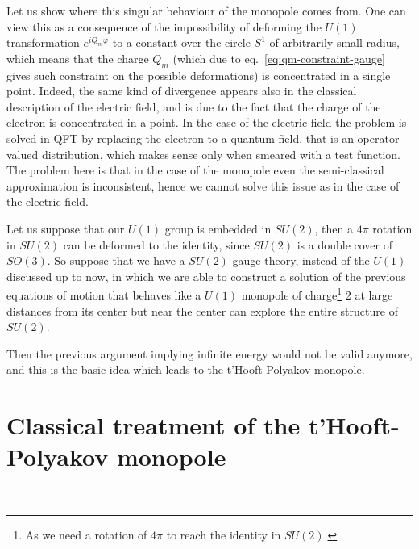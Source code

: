 \documentclass[../main/main.tex]{subfiles}
\begin{document}
\skipline

Let us show where this singular behaviour of the monopole comes from. One can view this as a consequence of the impossibility of deforming the $U(1)$ transformation $e^{iQ_m\varphi}$ to a constant over the circle $S^1$ of arbitrarily small radius, which means that the charge $Q_m$ (which due to eq.~\eqref{eq:qm-constraint-gauge} gives such constraint on the possible deformations) is concentrated in a single point. Indeed, the same kind of divergence appears also in the classical description of the electric field, and is due to the fact that the charge of the electron is concentrated in a point. In the case of the electric field the problem is solved in QFT by replacing the electron to a quantum field, that is an operator valued distribution, which makes sense only when smeared with a test function. 
The problem here is that  in the case of the monopole even the semi-classical approximation is inconsistent, hence we cannot solve this issue as in the case of the electric field. 

\skipline

Let us suppose that our $U(1)$ group is embedded in $SU(2)$, then a $4\pi$ rotation in $SU(2)$ can be deformed to the identity, since $SU(2)$ is a double cover of $SO(3)$. So suppose that we have a $SU(2)$ gauge theory, instead of the $U(1)$ discussed up to now, in which we are able to construct a solution of the previous equations of motion that behaves like a $U(1)$ monopole of charge\footnote{As we need a rotation of $4\pi$ to reach the identity in $SU(2)$.} 2   at large distances from its center but near the center can explore the entire structure of $SU(2)$. 

Then the previous argument implying infinite energy would not be valid anymore, and this is the basic idea which leads to the t'Hooft-Polyakov monopole. 

\section{Classical treatment of the t'Hooft-Polyakov monopole}

\cite[Chapter 4]{Shifman:2012}\\
\end{document}
